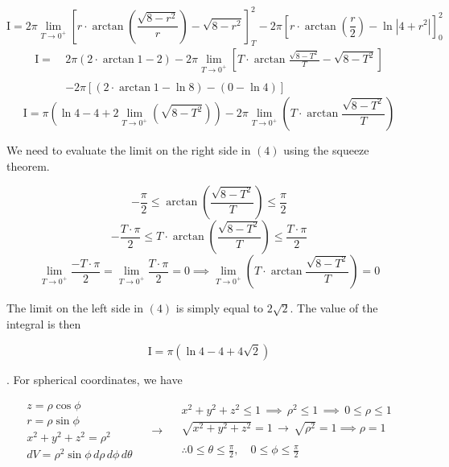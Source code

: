 \documentclass{article}
\begin{document}
\begin{equation*}
\mathrm{I}=2\pi\lim_{T\to0^+}\left[r\cdot\arctan\left(\frac{\sqrt{8-r^2}}r\right)-\sqrt{8-r^2}\right]_T^2-2\pi\left[r\cdot\arctan\left(\frac r2\right)-\ln\left|4+r^2\right|\right]_0^2
\end{equation*}
\begin{align*}
\mathrm{I}=\:&2\pi\left(2\cdot\arctan1-2\right)-2\pi\lim_{T\to0^+}\left[T\cdot\arctan\frac{\sqrt{8-T^2}}T-\sqrt{8-T^2}\right]\\\\&-2\pi\left[\left(2\cdot\arctan1-\ln8\right)-(0-\ln4)\right]
\end{align*}
\begin{equation}
\mathrm{I}=\pi\left(\ln4-4+2\lim_{T\to0^+}\left(\sqrt{8-T^2}\right)\right)-2\pi\lim_{T\to0^+}\left(T\cdot\arctan\frac{\sqrt{8-T^2}}T\right)
\end{equation}

\hfill

\noindent We need to evaluate the limit on the right side in $(4)$ using the squeeze theorem.

\[-\frac\pi2\leq\arctan\left(\frac{\sqrt{8-T^2}}T\right)\leq\frac\pi2\]
\[-\frac{T\cdot\pi}2\leq T\cdot\arctan\left(\frac{\sqrt{8-T^2}}T\right)\leq\frac{T\cdot\pi}2\]
\[\lim_{T\to0^+}\frac{-T\cdot\pi}2=\lim_{T\to0^+}\frac{T\cdot\pi}2=0\implies\lim_{T\to0^+}\left(T\cdot\arctan\frac{\sqrt{8-T^2}}T\right)=0\]

\newpage

\noindent The limit on the left side in $(4)$ is simply equal to $2\sqrt2$. The value of the integral is then

\[\boxed{\mathrm{I}=\pi\left(\ln4-4+4\sqrt2\right)}\]

\hfill

. For spherical coordinates, we have

\[
\begin{array}{c}
z=\rho\cos\phi\\
r=\rho\sin\phi\\
x^2+y^2+z^2=\rho^2\\
dV=\rho^2\sin\phi\,d\rho\,d\phi\,d\theta
\end{array}\quad\rightarrow\quad
\begin{array}{c}
x^2+y^2+z^2\leq1\,\implies\,\rho^2\leq1\,\implies\,0\leq\rho\leq1\\
\sqrt{x^2+y^2+z^2}=1\,\rightarrow\,\sqrt{\rho^2}=1\implies\rho=1\\\\
\displaystyle\therefore0\leq\theta\leq\frac\pi2,\quad0\leq\phi\leq\frac\pi2
\end{array}
\]
\end{document}
